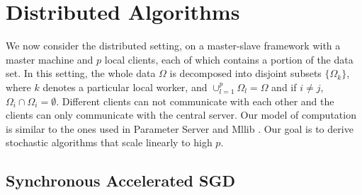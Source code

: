 \documentclass[10pt, conference, compsocconf]{IEEEtran}
\theoremstyle{definition}
\theoremstyle{remark}
\begin{document}
\section{Distributed Algorithms}

We now consider the distributed setting, on a master-slave framework with a master machine and $p$ local clients, each of which contains a portion of
the data set. In this setting, the whole data $\Omega$ is decomposed into disjoint
subsets $\{\Omega_k\}$,  where $k$ denotes  a  particular  local  worker,
and $\cup_{l=1}^p{\Omega_l} = \Omega$ and if $i\neq j$, $\Omega_i\cap\Omega_i = \emptyset$. Different clients can not communicate with each other and the  clients  can
only communicate with the central server. Our model of
computation is similar to the ones used in Parameter
Server \cite{Li2014} and Mllib \cite{Meng2016Spark}. Our goal is to
derive stochastic algorithms that scale linearly to high $p$.

\subsection{Synchronous Accelerated SGD}
\end{document}
